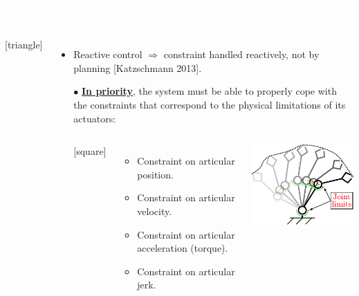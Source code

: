 \begin{frame}[noframenumbering]
\frametitle{{\textcolor{white}{\hspace{0.3cm}Reactive control -- the problem}}}

\begin{columns}
\column{.98\paperwidth}

[triangle]                        
\begin{itemize}
\item {\color{red}Reactive control} {\color{blue-violet}\textbf{$\Rightarrow$}} {\color{red}constraint handled reactively, not by planning} [Katzschmann 2013].
\setlength\itemsep{1em}
\item[$\bullet$] {\color{blue-violet}\textbf{\underline{In priority}}}, the system must be able to properly cope with the constraints that correspond to the physical limitations of its actuators:



\begin{columns}
\vspace{3mm}
[square]
\begin{itemize}
\addtolength{\itemindent}{6mm}
\item Constraint on articular position. 
\item Constraint on articular velocity.
\item Constraint on articular acceleration (torque).
\item Constraint on articular jerk.
\end{itemize}
\vspace{3mm}

\includegraphics[width=0.79\columnwidth]{figures/tele1.pdf}



\end{columns}
\end{itemize}
\end{columns}
\end{frame}
